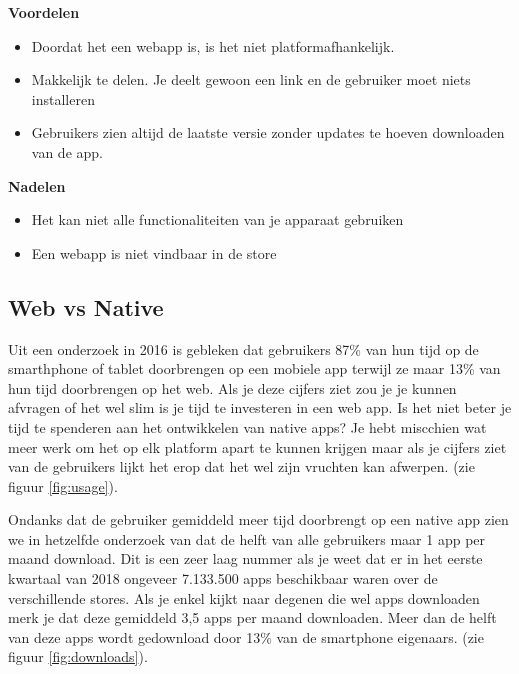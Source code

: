 \begin{minipage}[t]{0.5\textwidth}
	\textbf{Voordelen}
	\begin{itemize}  
		\item Doordat het een webapp is, is het niet platformafhankelijk. 
		\item Makkelijk te delen. Je deelt gewoon een link en de gebruiker moet niets installeren
		\item Gebruikers zien altijd de laatste versie zonder updates te hoeven downloaden van de app.
	\end{itemize}
\end{minipage}
\begin{minipage}[t]{0.5\textwidth}
	\textbf{Nadelen}
	\begin{itemize}  
		\item Het kan niet alle functionaliteiten van je apparaat gebruiken
		\item Een webapp is niet vindbaar in de store
	\end{itemize}
\end{minipage}


\subsection{Web vs Native}
Uit een onderzoek \textcite{comScore} in 2016 is gebleken  dat gebruikers 87\% van hun tijd op de smarthphone of tablet doorbrengen op een mobiele app terwijl ze maar 13\% van hun tijd doorbrengen op het web. Als je deze cijfers ziet zou je je kunnen afvragen of het wel slim is je tijd te investeren in een web app. Is het niet beter je tijd te spenderen aan het ontwikkelen van native apps? Je hebt miscchien wat meer werk om het op elk platform apart te kunnen krijgen maar als je cijfers ziet van de gebruikers lijkt het erop dat het wel zijn vruchten kan afwerpen.
(zie figuur \ref{fig:usage}). 

Ondanks dat de gebruiker gemiddeld meer tijd doorbrengt op een native app zien we in hetzelfde onderzoek van \textcite{comScore}  dat de helft van alle gebruikers maar 1 app per maand download. Dit is een zeer laag nummer als je weet dat er in het eerste kwartaal van 2018 ongeveer 7.133.500 apps beschikbaar waren over de verschillende stores. Als je enkel kijkt naar degenen die wel apps downloaden merk je dat deze gemiddeld 3,5 apps per maand downloaden. Meer dan de helft van deze apps wordt gedownload door 13\% van de smartphone eigenaars. (zie figuur \ref{fig:downloads}).

